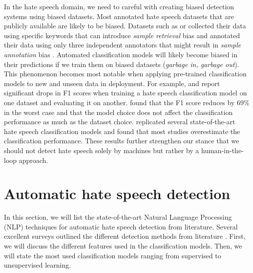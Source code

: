 %
In the hate speech domain, we need to careful with creating biased detection systems using biased datasets.
%
Most annotated hate speech datasets that are publicly available are likely to be biased.
%
%
Datasets such as \citet{waseem2016hateful} or \citet{basile2019semeval} collected their data using specific keywords that can introduce \textit{sample retrieval} bias and annotated their data using only three independent annotators that might result in \textit{sample annotation} bias \citep{balayn2021automatic}.
%
Automated classification models will likely become biased in their predictions if we train them on biased datasets (\emph{garbage in, garbage out}).
%
This phenomenon becomes most notable when applying pre-trained classification models to new and unseen data in deployment.
%
For example, \citet{grondahl2018all} and \citet{arango2019hate} report significant drops in F1 scores when training a hate speech classification model on one dataset and evaluating it on another.
%
\citet{grondahl2018all} found that the F1 score reduces by 69\% in the worst case and that the model choice does not affect the classification performance as much as the dataset choice.
%
\citet{arango2019hate} replicated several state-of-the-art hate speech classification models and found that most studies overestimate the classification performance.
%
These results further strengthen our stance that we should not detect hate speech solely by machines but rather by a human-in-the-loop approach.

\section{Automatic hate speech detection}
\label{sec:related-work-detection-algorithms}
%
In this section, we will list the state-of-the-art Natural Language Processing (NLP) techniques for automatic hate speech detection from literature.
%
Several excellent surveys outlined the different detection methods from literature  \citep{fortuna2018survey, schmidt2019survey}.
%
First, we will discuss the different features used in the classification models.
%
Then, we will state the most used classification models ranging from supervised to unsupervised learning.
%

